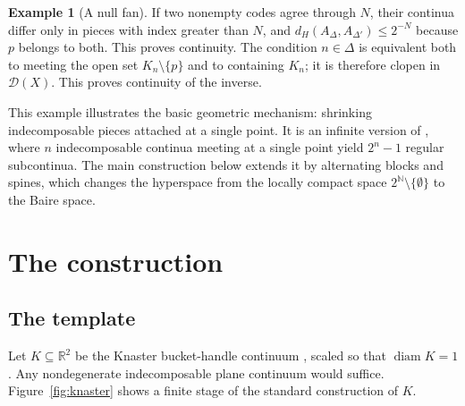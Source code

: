 \documentclass[11pt]{amsart}
\theoremstyle{definition}
\newtheorem{example}[theorem]{Example}
\theoremstyle{remark}
\newcommand{\diam}{\operatorname{diam}}
\newcommand{\D}{\mathcal{D}}
\newcommand{\N}{\mathbb{N}}
\newcommand{\R}{\mathbb{R}}
\newcommand{\dH}{d_H}
\begin{document}
\begin{example}[A null fan]
If two nonempty codes agree through $N$, their continua differ only in pieces with index greater than $N$, and $\dH(A_\Delta,A_{\Delta'})\le2^{-N}$ because $p$ belongs to both. This proves continuity. The condition $n\in\Delta$ is equivalent both to meeting the open set $K_n\setminus\{p\}$ and to containing $K_n$; it is therefore clopen in $\D(X)$. This proves continuity of the inverse.

This example illustrates the basic geometric mechanism: shrinking indecomposable pieces attached at a single point. It is an infinite version of \cite[Proposition~4.15(3)]{Or18}, where $n$ indecomposable continua meeting at a single point yield $2^n-1$ regular subcontinua. The main construction below extends it by alternating blocks and spines, which changes the hyperspace from the locally compact space $2^\N\setminus\{\emptyset\}$ to the Baire space.
\end{example}

\section{The construction}\label{sec:construction}

\subsection{The template}
Let $K\subseteq\R^2$ be the Knaster bucket-handle continuum \cite[Example~22.11]{IN}, scaled so that $\diam K=1$. Any nondegenerate indecomposable plane continuum would suffice. Figure~\ref{fig:knaster} shows a finite stage of the standard construction of $K$.
\end{document}
